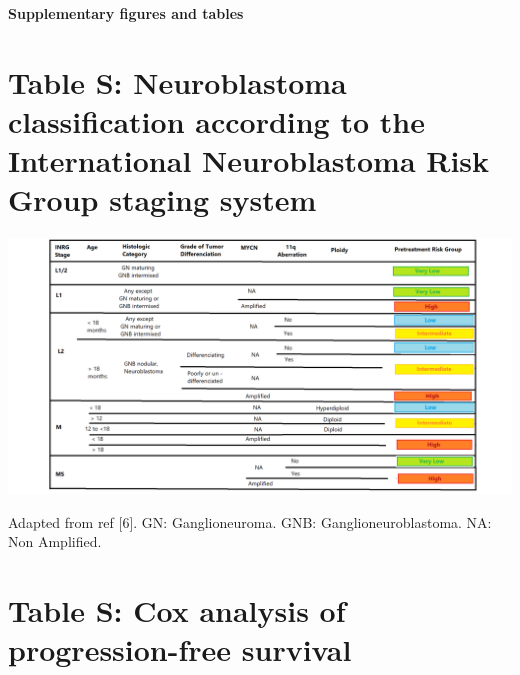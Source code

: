 \documentclass[11pt]{article}
\newcounter{fignb}  %
\newcounter{tabnb} %
\begin{document}
\renewcommand\thesection{}
\renewcommand\thesubsection{}
\renewcommand\thesubsubsection{}
\selectfont
{}
\graphicspath{
{/Users/benzekry/work/marseille/neuroblastome_andre/code/}
{figures_files/}
}
\setlength{\parindent}{0mm}
\textbf{\Huge{Supplementary figures and tables}}

\renewcommand{\cfttoctitlefont}{\normalfont\MakeUppercase}
\renewcommand{\contentsname}{}
\tableofcontents

\vskip2cm
\newpage
\vskip2cm
\renewcommand\thesection{}
\def\spaceV{\vskip0.5cm}
\newpage
{}
\section{Table S: Neuroblastoma classification according to the International Neuroblastoma Risk Group staging system}
\spaceV
\begin{center}
\includegraphics[width=1\textwidth]{table_S1}
\end{center}
Adapted from ref [6]. GN: Ganglioneuroma. GNB: Ganglioneuroblastoma. NA: Non Amplified.
\newpage
{}
\section{Table S: Cox analysis of progression-free survival}
\spaceV
\begin{center}

\end{center}
\newpage
{}
\end{document}

